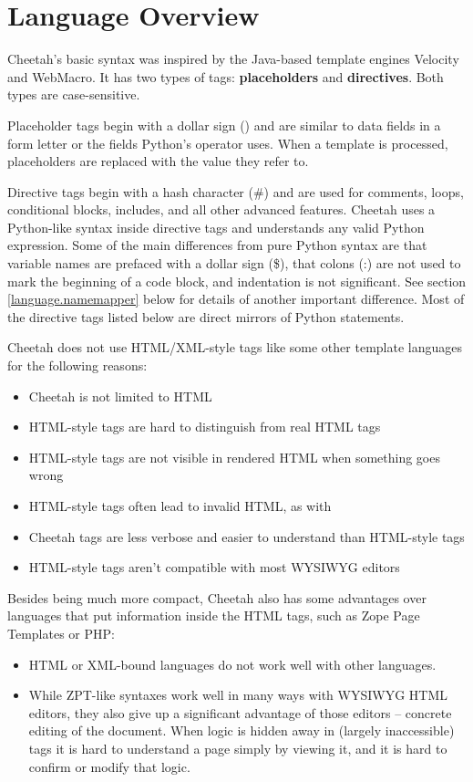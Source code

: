 \section{Language Overview}
\label{language}


Cheetah's basic syntax was inspired by the Java-based template engines Velocity
and WebMacro. It has two types of tags: {\bf placeholders} and {\bf directives}.
Both types are case-sensitive.  

Placeholder tags begin with a dollar sign () and are similar to
data fields in a form letter or the  fields Python's \code{\%}
operator uses. When a template is processed, placeholders are replaced with the
value they refer to.

Directive tags begin with a hash character (\#) and are used for comments, loops,
conditional blocks, includes, and all other advanced features. Cheetah uses a
Python-like syntax inside directive tags and understands any valid Python
expression.  Some of the main differences from pure Python syntax are that
variable names are prefaced with a dollar sign (\$), that colons (:) are not
used to mark the beginning of a code block, and indentation is not significant.
See section \ref{language.namemapper} below for details of another important
difference. Most of the directive tags listed below are direct mirrors of Python
statements.

Cheetah does not use HTML/XML-style tags like some other template languages for
the following reasons:
\begin{itemize}
\item Cheetah is not limited to HTML
\item HTML-style tags are hard to distinguish from real HTML tags
\item HTML-style tags are not visible in rendered HTML when something goes wrong
\item HTML-style tags often lead to invalid HTML, as with
\item Cheetah tags are less verbose and easier to understand than
     HTML-style tags
\item HTML-style tags aren't compatible with most WYSIWYG editors
\end{itemize}

Besides being much more compact, Cheetah also has some advantages over
languages that put information inside the HTML tags, such as Zope Page
Templates or PHP:

\begin{itemize}
\item HTML or XML-bound languages do not work well with other languages.
\item While ZPT-like syntaxes work well in many ways with WYSIWYG HTML editors,
     they also give up a significant advantage of those editors -- concrete
     editing of the document.  When logic is hidden away in (largely
     inaccessible) tags it is hard to understand a page simply by viewing it,
     and it is hard to confirm or modify that logic.
\end{itemize}


